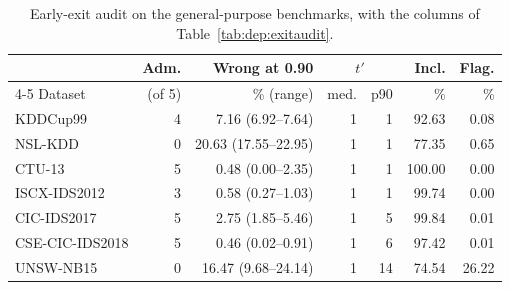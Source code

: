 \begin{table}[!t]
\centering
\caption{Early-exit audit on the general-purpose benchmarks, with the columns of Table~\ref{tab:dep:exitaudit}.}
\label{tab:exit_general}
\scriptsize
\setlength{\tabcolsep}{3pt}
\begin{tabular}{lrrrrrr}
\toprule
& Adm. & Wrong at 0.90 & \multicolumn{2}{c}{$t'$} & Incl. & Flag. \\
\cmidrule(lr){4-5}
Dataset & (of 5) & \% (range) & med. & p90 & \% & \% \\
\midrule
KDDCup99 & 4 & 7.16 (6.92--7.64) & 1 & 1 & 92.63 & 0.08 \\
NSL-KDD & 0 & 20.63 (17.55--22.95) & 1 & 1 & 77.35 & 0.65 \\
CTU-13 & 5 & 0.48 (0.00--2.35) & 1 & 1 & 100.00 & 0.00 \\
ISCX-IDS2012 & 3 & 0.58 (0.27--1.03) & 1 & 1 & 99.74 & 0.00 \\
CIC-IDS2017 & 5 & 2.75 (1.85--5.46) & 1 & 5 & 99.84 & 0.01 \\
CSE-CIC-IDS2018 & 5 & 0.46 (0.02--0.91) & 1 & 6 & 97.42 & 0.01 \\
UNSW-NB15 & 0 & 16.47 (9.68--24.14) & 1 & 14 & 74.54 & 26.22 \\
\bottomrule
\end{tabular}
\end{table}
